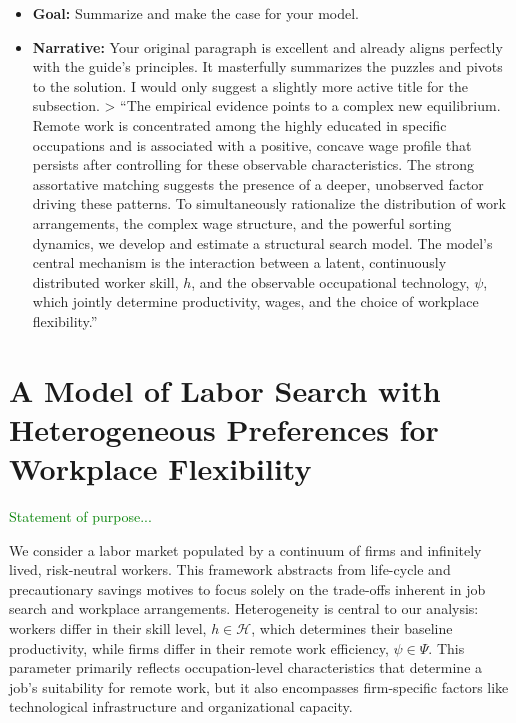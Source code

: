 \documentclass[
  11pt,
  letterpaper,
  DIV=11,
  numbers=noendperiod]{scrartcl}
\providecommand{\tightlist}{%
  \setlength{\itemsep}{0pt}\setlength{\parskip}{0pt}}\usepackage{longtable,booktabs,array}
\begin{document}
\begin{itemize}
\tightlist
\item
  \textbf{Goal:} Summarize and make the case for your model.
\item
  \textbf{Narrative:} Your original paragraph is excellent and already
  aligns perfectly with the guide's principles. It masterfully
  summarizes the puzzles and pivots to the solution. I would only
  suggest a slightly more active title for the subsection.
  \textgreater{} ``The empirical evidence points to a complex new
  equilibrium. Remote work is concentrated among the highly educated in
  specific occupations and is associated with a positive, concave wage
  profile that persists after controlling for these observable
  characteristics. The strong assortative matching suggests the presence
  of a deeper, unobserved factor driving these patterns. To
  simultaneously rationalize the distribution of work arrangements, the
  complex wage structure, and the powerful sorting dynamics, we develop
  and estimate a structural search model. The model's central mechanism
  is the interaction between a latent, continuously distributed worker
  skill, \(h\), and the observable occupational technology, \(\psi\),
  which jointly determine productivity, wages, and the choice of
  workplace flexibility.''
\end{itemize}

\section{A Model of Labor Search with Heterogeneous Preferences for
Workplace
Flexibility}\label{a-model-of-labor-search-with-heterogeneous-preferences-for-workplace-flexibility}

\textcolor{green}{Statement of purpose...}

We consider a labor market populated by a continuum of firms and
infinitely lived, risk-neutral workers. This framework abstracts from
life-cycle and precautionary savings motives to focus solely on the
trade-offs inherent in job search and workplace arrangements.
Heterogeneity is central to our analysis: workers differ in their skill
level, \(h \in \mathcal{H}\), which determines their baseline
productivity, while firms differ in their remote work efficiency,
\(\psi \in \Psi\). This parameter primarily reflects occupation-level
characteristics that determine a job's suitability for remote work, but
it also encompasses firm-specific factors like technological
infrastructure and organizational capacity.
\end{document}
